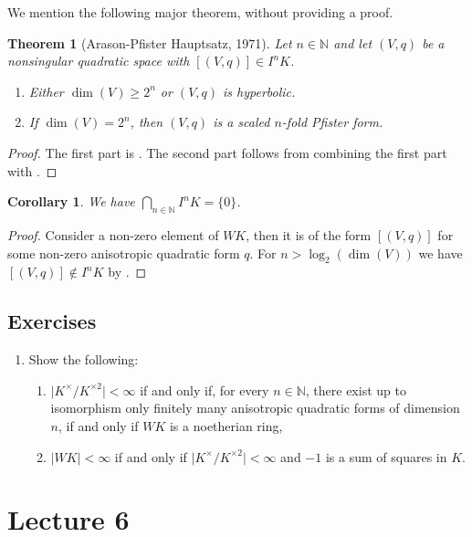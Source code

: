 \documentclass[12pt, leqno, british]{amsart}
\theoremstyle{definition}
\theoremstyle{plain}
\newtheorem{thm}[defi]{Theorem}
\newtheorem{cor}[defi]{Corollary}
\theoremstyle{remark}
\newcommand{\mbb}{\mathbb}
\newcommand{\nat}{\mbb N}
\begin{document}
We mention the following major theorem, without providing a proof.
\begin{thm}[Arason-Pfister Hauptsatz, 1971]\label{T:Arason-Pfister}
Let $n \in \nat$ and let $(V, q)$ be a nonsingular quadratic space with $[(V, q)] \in I^n K$.
\begin{enumerate}
\item Either $\dim(V) \geq 2^n$ or $(V, q)$ is hyperbolic.
\item If $\dim(V) = 2^n$, then $(V, q)$ is a scaled $n$-fold Pfister form.
\end{enumerate}
\end{thm}
\begin{proof}
The first part is \autocite[Theorem 23.7]{ElmanKarpenkoMerkurjev}.
The second part follows from combining the first part with .
\end{proof}
\begin{cor}
We have $\bigcap_{n \in \nat} I^n K = \lbrace 0 \rbrace$.
\end{cor}
\begin{proof}
Consider a non-zero element of $WK$, then it is of the form $[(V, q)]$ for some non-zero anisotropic quadratic form $q$.
For $n > \log_2(\dim(V))$ we have $[(V, q)] \not\in I^n K$ by .
\end{proof}

\subsection{Exercises}
\begin{enumerate}
\item Show the following:
\begin{enumerate}
\item $\lvert K^\times / K^{\times 2} \rvert < \infty$ if and only if, for every $n \in \nat$, there exist up to isomorphism only finitely many anisotropic quadratic forms of dimension $n$, if and only if $WK$ is a noetherian ring,
\item $\lvert WK \rvert < \infty$ if and only if $\lvert K^\times / K^{\times 2} \rvert < \infty$ and $-1$ is a sum of squares in $K$.
\end{enumerate}
\end{enumerate}

\section{Lecture 6}
\end{document}
